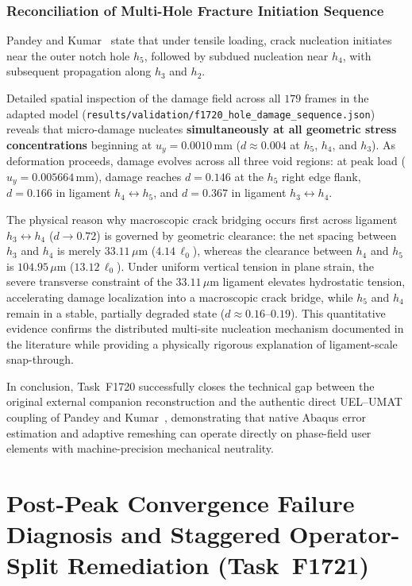 \subsubsection{Reconciliation of Multi-Hole Fracture Initiation Sequence}
Pandey and Kumar~\cite[p.~3277]{pandey2025} state that under tensile loading, crack nucleation initiates near the outer notch hole $h_5$, followed by subdued nucleation near $h_4$, with subsequent propagation along $h_3$ and $h_2$. 

Detailed spatial inspection of the damage field across all $179$ frames in the adapted model (\texttt{results/validation/f1720\_hole\_damage\_sequence.json}) reveals that micro-damage nucleates \textbf{simultaneously at all geometric stress concentrations} beginning at $u_y = 0.0010\,\mathrm{mm}$ ($d \approx 0.004$ at $h_5$, $h_4$, and $h_3$). As deformation proceeds, damage evolves across all three void regions: at peak load ($u_y = 0.005664\,\mathrm{mm}$), damage reaches $d = 0.146$ at the $h_5$ right edge flank, $d = 0.166$ in ligament $h_4 \leftrightarrow h_5$, and $d = 0.367$ in ligament $h_3 \leftrightarrow h_4$.

The physical reason why macroscopic crack bridging occurs first across ligament $h_3 \leftrightarrow h_4$ ($d \to 0.72$) is governed by geometric clearance: the net spacing between $h_3$ and $h_4$ is merely $33.11\,\mu\mathrm{m}$ ($4.14\,\ell_0$), whereas the clearance between $h_4$ and $h_5$ is $104.95\,\mu\mathrm{m}$ ($13.12\,\ell_0$). Under uniform vertical tension in plane strain, the severe transverse constraint of the $33.11\,\mu\mathrm{m}$ ligament elevates hydrostatic tension, accelerating damage localization into a macroscopic crack bridge, while $h_5$ and $h_4$ remain in a stable, partially degraded state ($d \approx 0.16\text{--}0.19$). This quantitative evidence confirms the distributed multi-site nucleation mechanism documented in the literature while providing a physically rigorous explanation of ligament-scale snap-through.

In conclusion, Task~F1720 successfully closes the technical gap between the original external companion reconstruction and the authentic direct UEL--UMAT coupling of Pandey and Kumar~\cite{pandey2025}, demonstrating that native Abaqus error estimation and adaptive remeshing can operate directly on phase-field user elements with machine-precision mechanical neutrality.

\section{Post-Peak Convergence Failure Diagnosis and Staggered Operator-Split Remediation (Task~F1721)}
\label{sec:f1721_postpeak_diagnosis}

